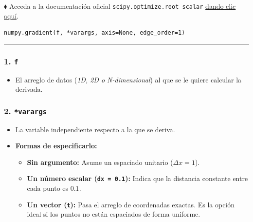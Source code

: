 \documentclass[12pt]{article}
\begin{document}
\newpage 
\begin{cajaflex}

$\blacklozenge$ Acceda a la documentación oficial \lstinline|scipy.optimize.root_scalar| 
\href{https://numpy.org/doc/stable/reference/generated/numpy.gradient.html}{dando clic aquí}.

\lstinline|numpy.gradient(f, *varargs, axis=None, edge_order=1)|

\textcolor{teal!60!black}{\rule{\linewidth}{0.8pt}}

\vspace{0.1cm}

\subsubsection*{\textcolor{teal!70!black}{1. \texttt{f} }}
\begin{itemize}
    \item El arreglo de datos (\textit{1D, 2D o N-dimensional}) al que se le quiere calcular la derivada.
\end{itemize}

\subsubsection*{\textcolor{teal!70!black}{2. \texttt{*varargs} }}
\begin{itemize}
    \item La variable independiente respecto a la que se deriva.
    \item \textbf{Formas de especificarlo:}
    \begin{itemize}
        \item \textbf{Sin argumento:} Asume un espaciado unitario ($\Delta x = 1$).
        \item \textbf{Un número escalar (\texttt{dx = 0.1}):} Indica que la distancia constante entre cada punto es $0.1$.
        \item \textbf{Un vector (\texttt{t}):} Pasa el arreglo de coordenadas exactas. Es la opción ideal si los puntos no están espaciados de forma uniforme.
    \end{itemize}
\end{itemize}


\end{cajaflex}
\end{document}
